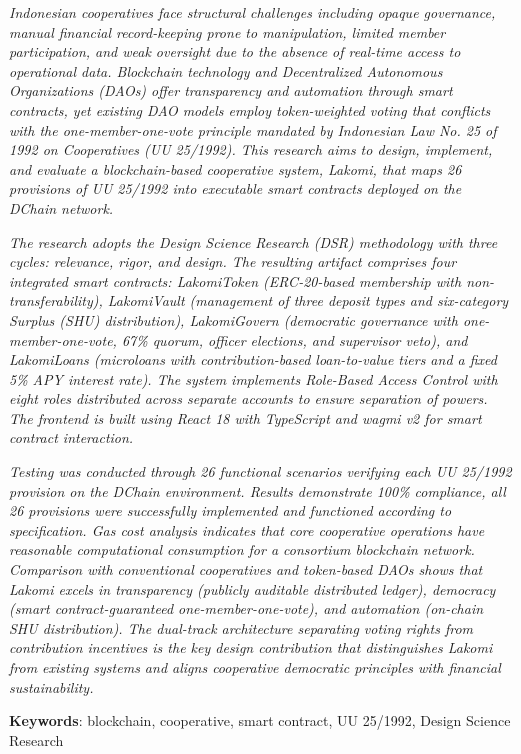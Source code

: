 \textit{
Indonesian cooperatives face structural challenges including opaque governance, manual financial record-keeping prone to manipulation, limited member participation, and weak oversight due to the absence of real-time access to operational data. Blockchain technology and Decentralized Autonomous Organizations (DAOs) offer transparency and automation through smart contracts, yet existing DAO models employ token-weighted voting that conflicts with the one-member-one-vote principle mandated by Indonesian Law No. 25 of 1992 on Cooperatives (UU 25/1992). This research aims to design, implement, and evaluate a blockchain-based cooperative system, Lakomi, that maps 26 provisions of UU 25/1992 into executable smart contracts deployed on the DChain network.
}

\textit{
The research adopts the Design Science Research (DSR) methodology with three cycles: relevance, rigor, and design. The resulting artifact comprises four integrated smart contracts: LakomiToken (ERC-20-based membership with non-transferability), LakomiVault (management of three deposit types and six-category Surplus (SHU) distribution), LakomiGovern (democratic governance with one-member-one-vote, 67\% quorum, officer elections, and supervisor veto), and LakomiLoans (microloans with contribution-based loan-to-value tiers and a fixed 5\% APY interest rate). The system implements Role-Based Access Control with eight roles distributed across separate accounts to ensure separation of powers. The frontend is built using React 18 with TypeScript and wagmi v2 for smart contract interaction.
}

\textit{
Testing was conducted through 26 functional scenarios verifying each UU 25/1992 provision on the DChain environment. Results demonstrate 100\% compliance, all 26 provisions were successfully implemented and functioned according to specification. Gas cost analysis indicates that core cooperative operations have reasonable computational consumption for a consortium blockchain network. Comparison with conventional cooperatives and token-based DAOs shows that Lakomi excels in transparency (publicly auditable distributed ledger), democracy (smart contract-guaranteed one-member-one-vote), and automation (on-chain SHU distribution). The dual-track architecture separating voting rights from contribution incentives is the key design contribution that distinguishes Lakomi from existing systems and aligns cooperative democratic principles with financial sustainability.
}

\vspace{1cm}
\noindent\textbf{Keywords}: blockchain, cooperative, smart contract, UU 25/1992, Design Science Research
